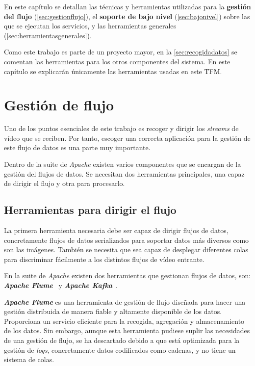 
En este capítulo se detallan las técnicas y herramientas utilizadas para la \textbf{gestión del flujo} (\autoref{sec:gestionflujo}), el \textbf{soporte de bajo nivel} (\autoref{sec:bajonivel}) sobre las que se ejecutan los servicios, y las herramientas generales (\autoref{sec:herramientasgenerales}).

Como este trabajo es parte de un proyecto mayor, en la \autoref{sec:recogidadatos} se comentan las herramientas para los otros componentes del sistema. En este capítulo se explicarán únicamente las herramientas usadas en este TFM.

\section{Gestión de flujo}\label{sec:gestionflujo}

Uno de los puntos  esenciales de este trabajo es recoger y dirigir los \textit{streams} de vídeo que se reciben. Por tanto, escoger una correcta aplicación para la gestión de este flujo de datos es una parte muy importante.

Dentro de la suite de \textit{Apache} existen varios componentes que se encargan de la gestión del flujos de datos. Se necesitan dos herramientas principales, una capaz de dirigir el flujo y otra para procesarlo.

\subsection{Herramientas para dirigir el flujo}
La primera herramienta necesaria debe ser capaz de dirigir flujos de datos, concretamente flujos de datos serializados para soportar datos más diversos como son las imágenes. También se necesita que sea capaz de desplegar diferentes colas para discriminar fácilmente a los distintos flujos de vídeo entrante.

En la suite de \textit{Apache} existen dos herramientas que gestionan flujos de datos, son: \textit{\textbf{Apache Flume}}~\cite{noauthorapacheflume} y \textit{\textbf{Apache Kafka}}~\cite{noauthorapachenodate}.

\textit{\textbf{Apache Flume}} es una herramienta de gestión de flujo diseñada para hacer una gestión distribuida de manera fiable y altamente disponible de los datos. Proporciona un servicio eficiente para la recogida, agregación y almacenamiento de los datos. Sin embargo, aunque esta herramienta pudiese suplir las necesidades de una gestión de flujo, se ha descartado debido a que está optimizada para la gestión de \textit{logs}, concretamente datos codificados como cadenas, y no tiene un sistema de colas.

